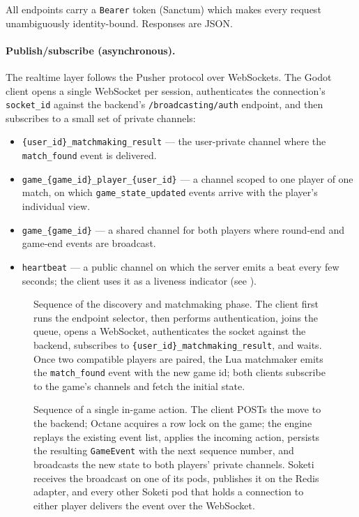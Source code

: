 \documentclass{scrartcl}
\newcommand{\figtikz}[2]{%
    \begin{figure}
        \centering
        \resizebox{\textwidth}{!}{}
        \caption{#2}
        \label{fig:#1}
    \end{figure}%
}
\begin{document}
All endpoints carry a \texttt{Bearer} token (Sanctum) which makes every
request unambiguously identity-bound. Responses are JSON.

\paragraph{Publish/subscribe (asynchronous).} The realtime layer follows
the Pusher protocol over WebSockets. The Godot client opens a single
WebSocket per session, authenticates the connection's
\texttt{socket\_id} against the backend's \texttt{/broadcasting/auth}
endpoint, and then subscribes to a small set of private channels:

\begin{itemize}[leftmargin=1.4em]
  \item \texttt{\{user\_id\}\_matchmaking\_result} --- the user-private
  channel where the \texttt{match\_found} event is delivered.
  \item \texttt{game\_\{game\_id\}\_player\_\{user\_id\}} --- a
  channel scoped to one player of one match, on which
  \texttt{game\_state\_updated} events arrive with the player's
  individual view.
  \item \texttt{game\_\{game\_id\}} --- a shared channel for both
  players where round-end and game-end events are broadcast.
  \item \texttt{heartbeat} --- a public channel on which the server
  emits a beat every few seconds; the client uses it as a liveness
  indicator (see ).
\end{itemize}

\figtikz{seq-matchmaking}{Sequence of the discovery and
matchmaking phase. The client first runs the endpoint selector, then
performs authentication, joins the queue, opens a WebSocket,
authenticates the socket against the backend, subscribes to
\texttt{\{user\_id\}\_matchmaking\_result}, and waits. Once two
compatible players are paired, the Lua matchmaker emits the
\texttt{match\_found} event with the new game id; both clients
subscribe to the game's channels and fetch the initial state.}

\figtikz{seq-action}{Sequence of a single in-game action. The
client POSTs the move to the backend; Octane acquires a row lock on
the game; the engine replays the existing event list, applies the
incoming action, persists the resulting \texttt{GameEvent} with the
next sequence number, and broadcasts the new state to both players'
private channels. Soketi receives the broadcast on one of its pods,
publishes it on the Redis adapter, and every other Soketi pod that
holds a connection to either player delivers the event over the
WebSocket.}
\end{document}
